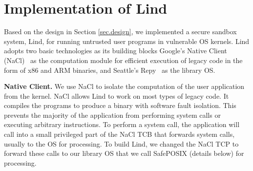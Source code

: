 \section{Implementation of Lind}
\label{sec.implementation}

Based on the design in Section \ref{sec.design},
we implemented a secure sandbox system, Lind,
for running untrusted user programs in vulnerable OS kernels.
Lind adopts two basic technologies as its building blocks\textendash
%
Google's Native Client (NaCl)~\cite{NaCl-09} as the computation
module for efficient execution of legacy code in the
form of x86 and ARM binaries, and 
Seattle's Repy~\cite{Repy-10} as the library OS. 


\textbf{Native Client.}
We use NaCl to isolate the computation of the user application
from the kernel. NaCl allows Lind to work on most types of legacy code.
It compiles the programs to produce a binary with software fault isolation.
This prevents the majority of the application from performing system calls
or executing arbitrary instructions.
%
To perform a system call, the application will call into a small privileged
part of the NaCl TCB that forwards system calls, usually to the OS for
processing. To build Lind, we changed the NaCl TCP to
forward these calls to our library OS that we call SafePOSIX (details below)
for processing. 

